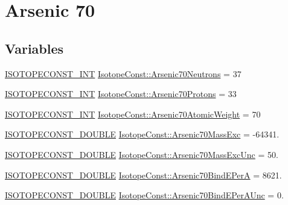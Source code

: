 \hypertarget{group___isotope_const-_arsenic-_as70}{}\section{Arsenic 70}
\label{group___isotope_const-_arsenic-_as70}
\subsection*{Variables}
\begin{DoxyCompactItemize}
\item 
\mbox{\hyperlink{group___isotope_const-_macros_ga5f18360b3e99483a35c32d789e62621c}{I\+S\+O\+T\+O\+P\+E\+C\+O\+N\+S\+T\+\_\+\+I\+NT}} \mbox{\hyperlink{group___isotope_const-_arsenic-_as70_ga31d1740f30ab05a6d800188cd7417fdc}{Isotope\+Const\+::\+Arsenic70\+Neutrons}} = 37
\item 
\mbox{\hyperlink{group___isotope_const-_macros_ga5f18360b3e99483a35c32d789e62621c}{I\+S\+O\+T\+O\+P\+E\+C\+O\+N\+S\+T\+\_\+\+I\+NT}} \mbox{\hyperlink{group___isotope_const-_arsenic-_as70_ga6d9a28a8a7a5cb7e9d4cdf42d7f65a89}{Isotope\+Const\+::\+Arsenic70\+Protons}} = 33
\item 
\mbox{\hyperlink{group___isotope_const-_macros_ga5f18360b3e99483a35c32d789e62621c}{I\+S\+O\+T\+O\+P\+E\+C\+O\+N\+S\+T\+\_\+\+I\+NT}} \mbox{\hyperlink{group___isotope_const-_arsenic-_as70_gabdf1ceec1af2c0ea462f6aa8861bd753}{Isotope\+Const\+::\+Arsenic70\+Atomic\+Weight}} = 70
\item 
\mbox{\hyperlink{group___isotope_const-_macros_ga8f45a7272ce02c0b4c65c44636ed719a}{I\+S\+O\+T\+O\+P\+E\+C\+O\+N\+S\+T\+\_\+\+D\+O\+U\+B\+LE}} \mbox{\hyperlink{group___isotope_const-_arsenic-_as70_ga580f2d69b3be32dc2fd550f8ede2d75e}{Isotope\+Const\+::\+Arsenic70\+Mass\+Exc}} = -\/64341.
\item 
\mbox{\hyperlink{group___isotope_const-_macros_ga8f45a7272ce02c0b4c65c44636ed719a}{I\+S\+O\+T\+O\+P\+E\+C\+O\+N\+S\+T\+\_\+\+D\+O\+U\+B\+LE}} \mbox{\hyperlink{group___isotope_const-_arsenic-_as70_ga4b404951a64cb5bde24d0ce46f25043a}{Isotope\+Const\+::\+Arsenic70\+Mass\+Exc\+Unc}} = 50.
\item 
\mbox{\hyperlink{group___isotope_const-_macros_ga8f45a7272ce02c0b4c65c44636ed719a}{I\+S\+O\+T\+O\+P\+E\+C\+O\+N\+S\+T\+\_\+\+D\+O\+U\+B\+LE}} \mbox{\hyperlink{group___isotope_const-_arsenic-_as70_gac47bc6988570f8fc995828115c10a504}{Isotope\+Const\+::\+Arsenic70\+Bind\+E\+PerA}} = 8621.
\item 
\mbox{\hyperlink{group___isotope_const-_macros_ga8f45a7272ce02c0b4c65c44636ed719a}{I\+S\+O\+T\+O\+P\+E\+C\+O\+N\+S\+T\+\_\+\+D\+O\+U\+B\+LE}} \mbox{\hyperlink{group___isotope_const-_arsenic-_as70_ga22b1c586376bef0224d5228bd06f7028}{Isotope\+Const\+::\+Arsenic70\+Bind\+E\+Per\+A\+Unc}} = 0.

\end{DoxyCompactItemize}
